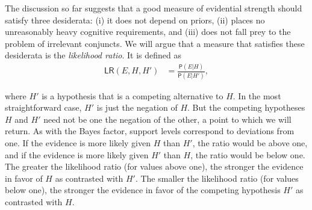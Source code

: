 \documentclass[
  10pt,
  dvipsnames,enabledeprecatedfontcommands]{scrartcl}
\newcommand{\pr}[1]{\mathsf{P}(#1)}
\begin{document}
The discussion so far suggests that a good measure of evidential
strength should satisfy three desiderata: (i) it does not depend on
priors, (ii) places no unreasonably heavy cognitive requirements, and
(iii) does not fall prey to the problem of irrelevant conjuncts. We will
argue that a measure that satisfies these desiderata is the
\emph{likelihood ratio}. It is defined as \begin{align*}
\mathsf{LR}(E,H,H') & = \frac{\pr{E \vert H}}{\pr{E \vert H'}},
\end{align*}

\noindent where \(H'\) is a hypothesis that is a competing alternative
to \(H\). In the most straightforward case, \(H'\) is just the negation
of \(H\). But the competing hypotheses \(H\) and \(H'\) need not be one
the negation of the other, a point to which we will return. As with the
Bayes factor, support levels correspond to deviations from one. If the
evidence is more likely given \(H\) than \(H'\), the ratio would be
above one, and if the evidence is more likely given \(H'\) than \(H\),
the ratio would be below one. The greater the likelihood ratio (for
values above one), the stronger the evidence in favor of \(H\) as
contrasted with \(H'\). The smaller the likelihood ratio (for values
below one), the stronger the evidence in favor of the competing
hypothesis \(H'\) as contrasted with \(H\).
\end{document}
